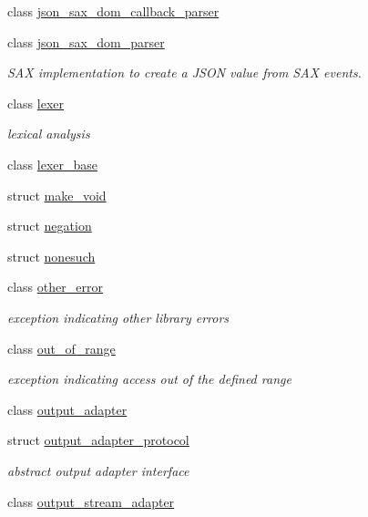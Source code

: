 \begin{DoxyCompactItemize}
\item 
class \hyperlink{classnlohmann_1_1detail_1_1json__sax__dom__callback__parser}{json\+\_\+sax\+\_\+dom\+\_\+callback\+\_\+parser}
\item 
class \hyperlink{classnlohmann_1_1detail_1_1json__sax__dom__parser}{json\+\_\+sax\+\_\+dom\+\_\+parser}
\begin{DoxyCompactList}\small\item\em S\+AX implementation to create a J\+S\+ON value from S\+AX events. \end{DoxyCompactList}\item 
class \hyperlink{classnlohmann_1_1detail_1_1lexer}{lexer}
\begin{DoxyCompactList}\small\item\em lexical analysis \end{DoxyCompactList}\item 
class \hyperlink{classnlohmann_1_1detail_1_1lexer__base}{lexer\+\_\+base}
\item 
struct \hyperlink{structnlohmann_1_1detail_1_1make__void}{make\+\_\+void}
\item 
struct \hyperlink{structnlohmann_1_1detail_1_1negation}{negation}
\item 
struct \hyperlink{structnlohmann_1_1detail_1_1nonesuch}{nonesuch}
\item 
class \hyperlink{classnlohmann_1_1detail_1_1other__error}{other\+\_\+error}
\begin{DoxyCompactList}\small\item\em exception indicating other library errors \end{DoxyCompactList}\item 
class \hyperlink{classnlohmann_1_1detail_1_1out__of__range}{out\+\_\+of\+\_\+range}
\begin{DoxyCompactList}\small\item\em exception indicating access out of the defined range \end{DoxyCompactList}\item 
class \hyperlink{classnlohmann_1_1detail_1_1output__adapter}{output\+\_\+adapter}
\item 
struct \hyperlink{structnlohmann_1_1detail_1_1output__adapter__protocol}{output\+\_\+adapter\+\_\+protocol}
\begin{DoxyCompactList}\small\item\em abstract output adapter interface \end{DoxyCompactList}\item 
class \hyperlink{classnlohmann_1_1detail_1_1output__stream__adapter}{output\+\_\+stream\+\_\+adapter}

\end{DoxyCompactItemize}
